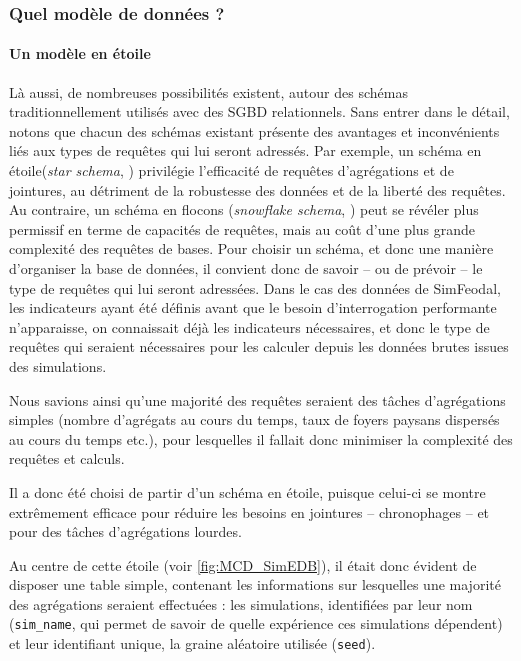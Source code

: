 		\subsubsection{Quel modèle de données ?}
			\paragraph*{Un modèle \og en étoile\fg{}}

		Là aussi, de nombreuses possibilités existent, autour des schémas traditionnellement utilisés avec des SGBD relationnels.
		Sans entrer dans le détail, notons que chacun des schémas existant présente des avantages et inconvénients liés aux types de requêtes qui lui seront adressés.
		Par exemple, un schéma \og en étoile\fg{}(\textit{star schema}, \autocite{noauthor_star_2018}) privilégie l'efficacité de requêtes d'agrégations et de jointures, au détriment de la robustesse des données et de la liberté des requêtes.
		Au contraire, un schéma \og en flocons\fg{} (\textit{snowflake schema}, \autocite{noauthor_snowflake_2018}) peut se révéler plus permissif en terme de capacités de requêtes, mais au coût d'une plus grande complexité des requêtes de bases.
		Pour choisir un schéma, et donc une manière d'organiser la base de données, il convient donc de savoir -- ou de prévoir -- le type de requêtes qui lui seront adressées.
		Dans le cas des données de SimFeodal, les indicateurs ayant été définis avant que le besoin d'interrogation performante n'apparaisse, on connaissait déjà les indicateurs nécessaires, et donc le type de requêtes qui seraient nécessaires pour les calculer depuis les données brutes issues des simulations.

		Nous savions ainsi qu'une majorité des requêtes seraient des tâches d'agrégations simples (nombre d'agrégats au cours du temps, taux de foyers paysans dispersés au cours du temps etc.), pour lesquelles il fallait donc minimiser la complexité des requêtes et calculs.

		Il a donc été choisi de partir d'un schéma en étoile, puisque celui-ci se montre extrêmement efficace pour réduire les besoins en jointures -- chronophages -- et pour des tâches d'agrégations lourdes.

		Au centre de cette étoile (voir \cref{fig:MCD_SimEDB}), il était donc évident de disposer une table simple, contenant les informations sur lesquelles une majorité des agrégations seraient effectuées : les simulations, identifiées par leur nom (\texttt{sim\_name}, qui permet de savoir de quelle expérience ces simulations dépendent) et leur identifiant unique, la graine aléatoire utilisée (\texttt{seed}).

